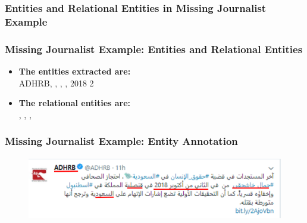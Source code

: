 \documentclass[xcolor=table]{beamer}
\begin{document}
\begin{frame}
\frametitle{Entities and Relational Entities in Missing Journalist Example }

\end{frame}

\begin{frame}
\frametitle{Missing Journalist Example: Entities and Relational Entities}

\begin{itemize}
\item \textbf{The entities extracted are:}
\\ ADHRB, ,
,
,
2018 2 
\\
\item \textbf{The relational entities are:}\\
,
,
,
\end{itemize}

\end{frame}

\begin{frame}
\frametitle{Missing Journalist Example: Entity Annotation}
\begin{figure}[!htb]
   \centering
    \includegraphics[scale=0.55]{img0009_1.png}
    
\end{figure}

\end{frame}
\end{document}
